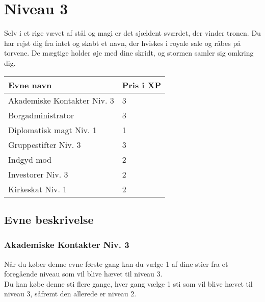 \chapter*{Niveau 3}
Selv i et rige vævet af stål og magi er det sjældent sværdet, der vinder tronen. Du har rejst dig fra intet og skabt et navn, der hviskes i royale sale og råbes på torvene. De mægtige holder øje med dine skridt, og stormen samler sig omkring dig.
\begin{table}[H]
    \centering
    \begin{tabular}{|p{}|p{}|}
    \rowcolor{cerulean!80}\hline
        Evne navn & Pris i XP \\\hline
        Akademiske Kontakter Niv. 3 & 3\\\hline
        Borgadministrator & 3\\\hline
        Diplomatisk magt Niv. 1 & 1\\\hline
        Gruppestifter Niv. 3 & 3 \\\hline
        Indgyd mod & 2\\\hline
        Investorer Niv. 3 & 2 \\\hline
        Kirkeskat Niv. 1 & 2 \\\hline
    \end{tabular}
\end{table}
\section*{Evne beskrivelse}

\subsection*{Akademiske Kontakter Niv. 3}

Når du køber denne evne første gang kan du vælge 1 af dine stier fra et foregående niveau som vil blive hævet til niveau 3.\\
Du kan købe denne sti flere gange, hver gang vælge 1 sti som vil blive hævet til niveau 3, såfremt den allerede er niveau 2. \\

